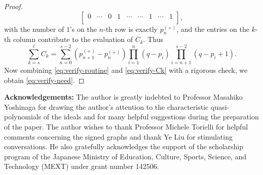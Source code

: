 \documentclass[12pt]{amsart}
\theoremstyle{plain}
\theoremstyle{definition}
\theoremstyle{remark}
\begin{document}
\begin{proof}
$$\begin{bmatrix}
0 & \cdots & 0 & 1 & \cdots & \cdots  & 1 & \cdots  & 1  \\
\end{bmatrix},
$$
with the number of $1$'s on the $n$-th row is exactly $p_{n}^{(+)}$, and the entries on the $k$-th column contribute to the evaluation of $C_k$.
Thus
  \begin{equation}
  \label{eq:verify-Ck}
 \sum_{k=s}^{\ell}C_k = \sum_{n=0}^{s-2}\left(p_{n+1}^{(+)}-p_{n}^{(+)} \right)\prod_{i=1}^{n}\left(q- p_i \right)\prod_{i=n+1}^{s-2}\left(q- p_i+1 \right).
       \end{equation}
Now combining \eqref{eq:verify-routine} and \eqref{eq:verify-Ck} with a rigorous check, we obtain \eqref{eq:verify-need}.


 \end{proof} 


\noindent
\textbf{Acknowledgements:} 
The author is greatly indebted to Professor Masahiko Yoshinaga for drawing the author's attention to the characteristic quasi-polynomials of the ideals and for many helpful suggestions during the preparation of the paper. 
The author wishes to thank Professor Michele Torielli for helpful comments concerning the signed graphs and thank Ye Liu for stimulating conversations. 
He also gratefully acknowledges the support of the scholarship program of 
the Japanese Ministry of Education, Culture, Sports, Science, and Technology 
(MEXT) under grant number 142506. 

 
 
 
\end{document}
